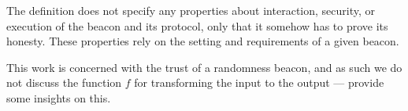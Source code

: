 
The definition does not specify any properties about interaction, security, or execution of the beacon and its protocol, only that it somehow has to prove its honesty.
These properties rely on the setting and requirements of a given beacon.

This work is concerned with the trust of a randomness beacon, and as such we do not discuss the function $f$ for transforming the input to the output --- \citet{bonneau2015bitcoin, dodis2004randomness} provide some insights on this.
